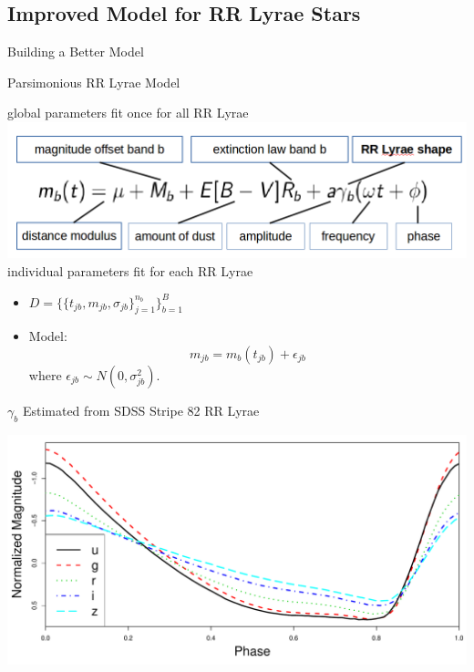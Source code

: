 \documentclass[12pt]{beamer}
\begin{document}
\subsection{Improved Model for RR Lyrae Stars}

\begin{frame}{Building a Better Model}

\end{frame}

\begin{frame}{Parsimonious RR Lyrae Model}


\begin{center}
global parameters fit once for all RR Lyrae\\
\includegraphics[scale=.3]{figs/model.png}\\
individual parameters fit for each RR Lyrae
\end{center}

\vspace{.2in}

\begin{itemize}
\item $D=\{\{t_{jb},m_{jb},\sigma_{jb}\}_{j=1}^{n_b}\}_{b=1}^B$
\item Model:
\begin{equation*}
m_{jb} = m_b(t_{jb}) + \epsilon_{jb}
\end{equation*}
where $\epsilon_{jb} \sim N(0,\sigma_{jb}^2)$.
\end{itemize}
\end{frame}

\begin{frame}{$\gamma_b$ Estimated from SDSS Stripe 82 RR Lyrae}

\begin{center}
\includegraphics[scale=.3]{figs/templates.pdf}
\end{center}

\end{frame}
\end{document}
